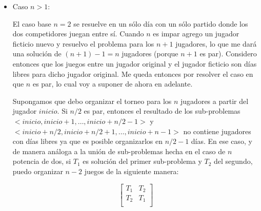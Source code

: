 \documentclass{article}
\newcommand{\asig}{\ensuremath{\leftarrow}}
\begin{document}
\begin{itemize}
\begin{lstlisting}[float,caption={Solución al ejercicio 2, caso potencias de dos},label=alg:ejercicio3a]
procedure torneo(n)
  return tabla(n, 1)

procedure tabla(n, inicio)
  if n = 2 do
    T = matriz(1,2)

    T[1][inicio] $\asig inicio+1$
    T[1][inicio+1] $\asig inicio$
    return T

  m1 $\asig tabla(n/2, inicio)$
  m2 $\asig tabla(n/2, inicio+(n/2))$

  vi $\asig unir_vertical(m1, m2)$
  vd $\asig unir_vertical(m2, m1)$

  piso $\asig matriz(1,n)$

  for i $\asig 1$ to $n / 2$ do
    piso[1][i] $\asig i+(n/2)$
    piso[1][$i+(n/2)$] $\asig i$

  total $\asig unir_horizontal(vi, vd)$

  return $unir_vertical(total, piso)$
\end{lstlisting}

\item Caso $n > 1$:

El caso base $n = 2$
se resuelve en un sólo día con un sólo partido donde los dos competidores juegan entre sí.
Cuando $n$ es impar agrego un jugador ficticio nuevo y resuelvo el problema
para los $n+1$ jugadores, lo que me dará una solución de $(n+1)-1 = n$ jugadores
(porque $n+1$ es par). Considero entonces que los juegos entre un jugador original
y el jugador ficticio son días libres para dicho jugador original. Me queda
entonces por resolver el caso en que $n$ es par, lo cual voy a suponer de ahora en
adelante.

Supongamos que debo organizar el torneo para los $n$ jugadores a partir del jugador $inicio$.
Si $n/2$ es par, entonces el resultado de los sub-problemas $<inicio,inicio+1,\ldots,inicio+n/2-1>$
y $<inicio+n/2,inicio+n/2+1,\ldots,inicio+n-1>$ no contiene jugadores con días libres ya que es
posible organizarlos en $n/2-1$ días. En ese caso, y de manera análoga a la unión de sub-problemas
hecha en el caso de $n$ potencia de dos, si $T_1$ es solución del primer sub-problema y $T_2$ del segundo,
puedo organizar $n-2$ juegos de la siguiente manera:

$$
\left[
\begin{array}{cc}
T_1 & T_2 \\
T_2 & T_1 \\
\end{array}
\right]
$$


\end{itemize}
\end{document}
